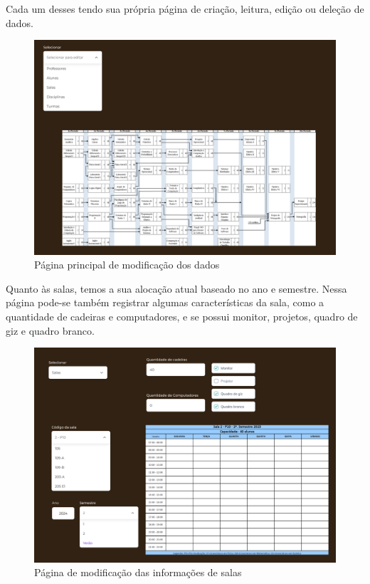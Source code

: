 
    Cada um desses tendo sua própria página de criação, leitura, edição ou deleção de dados.

    \begin{figure}[htbp]\centering
        \caption{\label{fig:CRUD_main} Página principal de modificação dos dados}
        \includegraphics[scale=0.8]{files/img/Prototipo/CRUD_main.png}
    \end{figure} %

    Quanto às salas, temos a sua alocação atual baseado no ano e semestre. Nessa página pode-se também registrar algumas características da sala, como a quantidade de cadeiras e computadores, e se possui monitor, projetos, quadro de giz e quadro branco.

    \begin{figure}[htbp]\centering
        \caption{\label{fig:CRUD_salas-Vazia} Página de modificação das informações de salas}
        \includegraphics[scale=0.8]{files/img/Prototipo/CRUD_salas-Vazia.png}
    \end{figure} %

